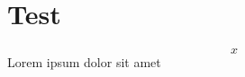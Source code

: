\documentclass{tufte-book}
\begin{document}
\chapter{Test}
\newpage
\vspace*{34547300sp} %
\[ x \]
Lorem ipsum dolor sit amet 
\end{document}
